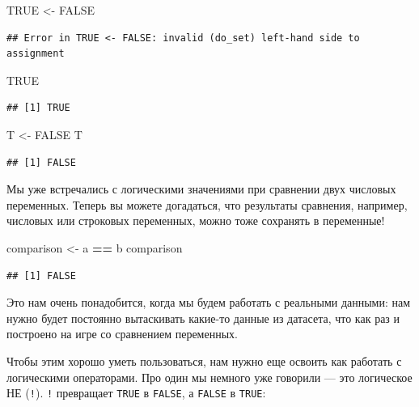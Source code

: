 \documentclass[
]{book}
\newenvironment{Shaded}{\begin{snugshade}}{\end{snugshade}}
\newcommand{\NormalTok}[1]{#1}
\newcommand{\OperatorTok}[1]{\textcolor[rgb]{0.81,0.36,0.00}{\textbf{#1}}}
\newcommand{\OtherTok}[1]{\textcolor[rgb]{0.56,0.35,0.01}{#1}}
\newcommand{\StringTok}[1]{\textcolor[rgb]{0.31,0.60,0.02}{#1}}
\begin{document}
\begin{Shaded}
\begin{Highlighting}[]
\OtherTok{TRUE}\NormalTok{ <-}\StringTok{ }\OtherTok{FALSE}
\end{Highlighting}
\end{Shaded}

\begin{verbatim}
## Error in TRUE <- FALSE: invalid (do_set) left-hand side to assignment
\end{verbatim}

\begin{Shaded}
\begin{Highlighting}[]
\OtherTok{TRUE}
\end{Highlighting}
\end{Shaded}

\begin{verbatim}
## [1] TRUE
\end{verbatim}

\begin{Shaded}
\begin{Highlighting}[]
\NormalTok{T <-}\StringTok{ }\OtherTok{FALSE}
\NormalTok{T}
\end{Highlighting}
\end{Shaded}

\begin{verbatim}
## [1] FALSE
\end{verbatim}

Мы уже встречались с логическими значениями при сравнении двух числовых переменных. Теперь вы можете догадаться, что результаты сравнения, например, числовых или строковых переменных, можно тоже сохранять в переменные!

\begin{Shaded}
\begin{Highlighting}[]
\NormalTok{comparison <-}\StringTok{ }\NormalTok{a }\OperatorTok{==}\StringTok{ }\NormalTok{b}
\NormalTok{comparison}
\end{Highlighting}
\end{Shaded}

\begin{verbatim}
## [1] FALSE
\end{verbatim}

Это нам очень понадобится, когда мы будем работать с реальными данными: нам нужно будет постоянно вытаскивать какие-то данные из датасета, что как раз и построено на игре со сравнением переменных.

Чтобы этим хорошо уметь пользоваться, нам нужно еще освоить как работать с логическими операторами. Про один мы немного уже говорили --- это логическое НЕ (\texttt{!}). \texttt{!} превращает \texttt{TRUE} в \texttt{FALSE}, а \texttt{FALSE} в \texttt{TRUE}:
\end{document}
